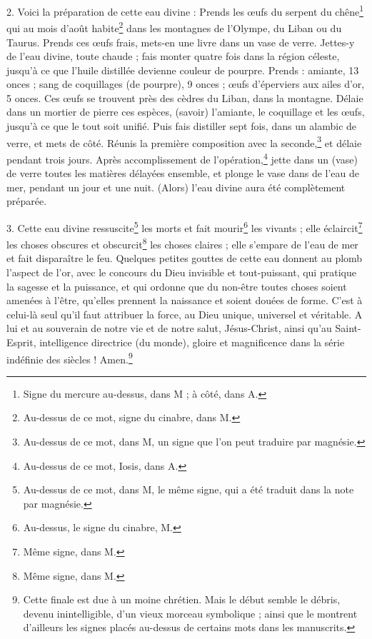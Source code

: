 \documentclass[a4paper, 11pt, oneside, polutonikogreek, french]{article}
\begin{document}
2. Voici la préparation de cette eau divine : Prends les œufs du serpent du chêne\footnote{Signe du mercure au-dessus, dans M ; à côté, dans A.} qui au mois d'août habite\footnote{Au-dessus de ce mot, signe du cinabre, dans M.} dans les montagnes de l'Olympe, du Liban ou du Taurus. Prends ces œufs frais, mets-en une livre dans un vase de verre. Jettes-y de l'eau divine, toute chaude ; fais monter quatre fois dans la région céleste, jusqu'à ce que l'huile distillée devienne couleur de pourpre. Prends : amiante, 13 onces ; sang de coquillages (de pourpre), 9 onces ; œufs d'éperviers aux ailes d'or, 5 onces. Ces œufs se trouvent près des cèdres du Liban, dans la montagne. Délaie dans un mortier de pierre ces espèces, (savoir) l'amiante, le coquillage et les œufs, jusqu'à ce que le tout soit unifié. Puis fais distiller sept fois, dans un alambic de verre, et mets de côté. Réunis la première composition avec la seconde,\footnote{Au-dessus de ce mot, dans M, un signe que l'on peut traduire par magnésie.} et délaie pendant trois jours. Après accomplissement de l'opération,\footnote{Au-dessus de ce mot, Iosis, dans A.} jette dans un (vase) de verre toutes les matières délayées ensemble, et plonge le vase dans de l'eau de mer, pendant un jour et une nuit. (Alors) l'eau divine aura été complètement préparée.

3. Cette eau divine ressuscite\footnote{Au-dessus de ce mot, dans M, le même signe, qui a été traduit dans la note par magnésie.} les morts et fait mourir\footnote{Au-dessus, le signe du cinabre, M.} les vivants ; elle éclaircit\footnote{Même signe, dans M.} les choses obscures et obscurcit\footnote{Même signe, dans M.} les choses claires ; elle s'empare de l'eau de mer et fait disparaître le feu. Quelques petites gouttes de cette eau donnent au plomb l'aspect de l'or, avec le concours du Dieu invisible et tout-puissant, qui pratique la sagesse et la puissance, et qui ordonne que du non-être toutes choses soient amenées à l'être, qu'elles prennent la naissance et soient douées de forme. C'est à celui-là seul qu'il faut attribuer la force, au Dieu unique, universel et véritable. A lui et au souverain de notre vie et de notre salut, Jésus-Christ, ainsi qu'au Saint-Esprit, intelligence directrice (du monde), gloire et magnificence dans la série indéfinie des siècles ! Amen.\footnote{Cette finale est due à un moine chrétien. Mais le début semble le débris, devenu inintelligible, d'un vieux morceau symbolique ; ainsi que le montrent d'ailleurs les signes placés au-dessus de certains mots dans les manuscrits.}
\end{document}
